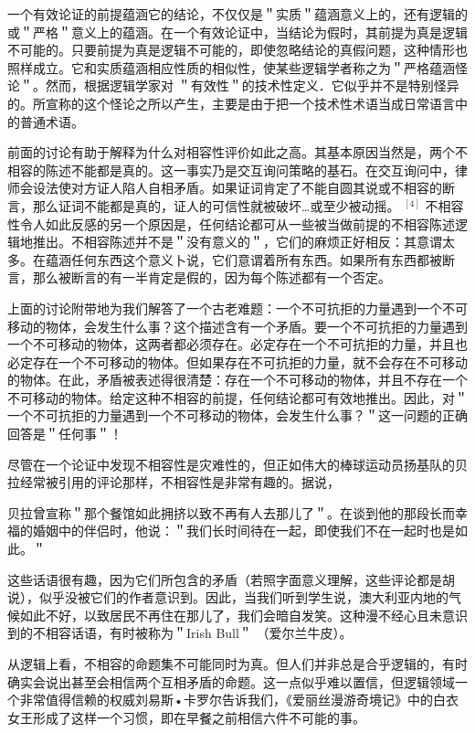 一个有效论证的前提蕴涵它的结论，不仅仅是＂实质＂蕴涵意义上的，还有逻辑的或＂严格＂意义上的蕴涵。在一个有效论证中，当结论为假时，其前提为真是逻辑不可能的。只要前提为真是逻辑不可能的，即使忽略结论的真假问题，这种情形也照样成立。它和实质蕴涵相应性质的相似性，使某些逻辑学者称之为＂严格蕴涵怪论＂。然而，根据逻辑学家对 ＂有效性＂的技术性定义．它似乎并不是特别怪异的。所宣称的这个怪论之所以产生，主要是由于把一个技术性术语当成日常语言中的普通术语。

前面的讨论有助于解释为什么对相容性评价如此之高。其基本原因当然是，两个不相容的陈述不能都是真的。这一事实乃是交互询问策略的基石。在交互询问中，律师会设法使对方证人陷人自相矛盾。如果证词肯定了不能自圆其说或不相容的断言，那么证词不能都是真的，证人的可信性就被破坏…或至少被动摇。 ${ }^{[4]}$ 不相容性令人如此反感的另一个原因是，任何结论都可从一些被当做前提的不相容陈述逻辑地推出。不相容陈述并不是＂没有意义的＂，它们的麻烦正好相反：其意谓太多。在蕴涵任何东西这个意义卜说，它们意谓着所有东西。如果所有东西都被断言，那么被断言的有一半肯定是假的，因为每个陈述都有一个否定。

上面的讨论附带地为我们解答了一个古老难题：一个不可抗拒的力量遇到一个不可移动的物体，会发生什么事？这个描述含有一个矛盾。要一个不可抗拒的力量遇到一个不可移动的物体，这两者都必须存在。必定存在一个不可抗拒的力量，并且也必定存在一个不可移动的物体。但如果存在不可抗拒的力量，就不会存在不可移动的物体。在此，矛盾被表述得很清楚：存在一个不可移动的物体，并且不存在一个不可移动的物体。给定这种不相容的前提，任何结论都可有效地推出。因此，对＂一个不可抗拒的力量遇到一个不可移动的物体，会发生什么事？＂这一问题的正确回答是＂任何事＂！

尽管在一个论证中发现不相容性是灾难性的，但正如伟大的棒球运动员扬基队的贝拉经常被引用的评论那样，不相容性是非常有趣的。据说，

贝拉曾宣称＂那个餐馆如此拥挤以致不再有人去那儿了＂。在谈到他的那段长而幸福的婚姻中的伴侣时，他说：＂我们长时间待在一起，即使我们不在一起时也是如此。＂

这些话语很有趣，因为它们所包含的矛盾（若照字面意义理解，这些评论都是胡说），似乎没被它们的作者意识到。因此，当我们听到学生说，澳大利亚内地的气候如此不好，以致居民不再住在那儿了，我们会暗自发笑。这种漫不经心且未意识到的不相容话语，有时被称为＂Irish Bull＂ （爱尔兰牛皮）。

从逻辑上看，不相容的命题集不可能同时为真。但人们并非总是合乎逻辑的，有时确实会说出甚至会相信两个互相矛盾的命题。这一点似乎难以置信，但逻辑领域一个非常值得信赖的权威刘易斯•卡罗尔告诉我们，《爱丽丝漫游奇境记》中的白衣女王形成了这样一个习惯，即在早餐之前相信六件不可能的事。 